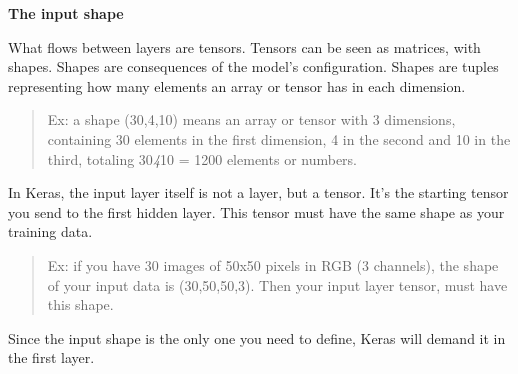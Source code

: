 \documentclass[11pt]{article}
\begin{document}
    \textbf{The input shape}

What flows between layers are tensors. Tensors can be seen as matrices,
with shapes. Shapes are consequences of the model's configuration.
Shapes are tuples representing how many elements an array or tensor has
in each dimension.

\begin{quote}
Ex: a shape (30,4,10) means an array or tensor with 3 dimensions,
containing 30 elements in the first dimension, 4 in the second and 10 in
the third, totaling 30\emph{4}10 = 1200 elements or numbers.
\end{quote}

In Keras, the input layer itself is not a layer, but a tensor. It's the
starting tensor you send to the first hidden layer. This tensor must
have the same shape as your training data.

\begin{quote}
Ex: if you have 30 images of 50x50 pixels in RGB (3 channels), the shape
of your input data is (30,50,50,3). Then your input layer tensor, must
have this shape.
\end{quote}

Since the input shape is the only one you need to define, Keras will
demand it in the first layer.
\end{document}
